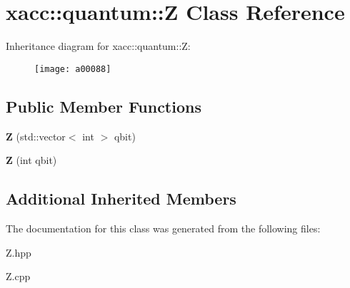 \hypertarget{a00088}{}\section{xacc\+:\+:quantum\+:\+:Z Class Reference}
\label{a00088}
Inheritance diagram for xacc\+:\+:quantum\+:\+:Z\+:\begin{figure}[H]
\begin{center}
\leavevmode
\texttt{[image: a00088]}
\end{center}
\end{figure}
\subsection*{Public Member Functions}
\begin{DoxyCompactItemize}
\item 
{\bfseries Z} (std\+::vector$<$ int $>$ qbit)\hypertarget{a00088_a5f1d311b357faed8c2665fe20cf24aeb}{}\label{a00088_a5f1d311b357faed8c2665fe20cf24aeb}

\item 
{\bfseries Z} (int qbit)\hypertarget{a00088_aa1bb7e533e7595e9ecd06879a2f8d2de}{}\label{a00088_aa1bb7e533e7595e9ecd06879a2f8d2de}

\end{DoxyCompactItemize}
\subsection*{Additional Inherited Members}


The documentation for this class was generated from the following files\+:\begin{DoxyCompactItemize}
\item 
Z.\+hpp\item 
Z.\+cpp\end{DoxyCompactItemize}
